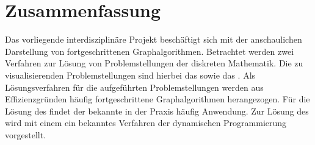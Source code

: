 %
%
%
%

\section*{Zusammenfassung}
Das vorliegende interdisziplinäre Projekt beschäftigt sich mit der anschaulichen Darstellung von fortgeschrittenen Graphalgorithmen. Betrachtet werden zwei Verfahren zur Lösung von Problemstellungen der diskreten Mathematik. Die zu visualisierenden Problemstellungen sind hierbei das \maxflowDE{} sowie das \spprcDE{}. Als Lösungsverfahren für die aufgeführten Problemstellungen werden aus Effizienzgründen häufig fortgeschrittene Graphalgorithmen herangezogen. Für die Lösung des \maxflowDEGen{} findet der bekannte \pushRelabelDE{} in der Praxis häufig Anwendung. Zur Lösung des \spprcDEGen{} wird mit einem  ein bekanntes Verfahren der dynamischen Programmierung vorgestellt.


